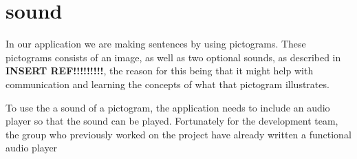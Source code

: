 \section{sound}

In our application we are making sentences by using pictograms. These pictograms consists of an image, as well as two optional sounds, as described in \textbf{INSERT REF!!!!!!!!!}, the reason for this being that it might help with communication and learning the concepts of what that pictogram illustrates.\newline

To use the a sound of a pictogram, the application needs to include an audio player so that the sound can be played. Fortunately for the development team, the group who previously worked on the project have already written a functional audio player

   
